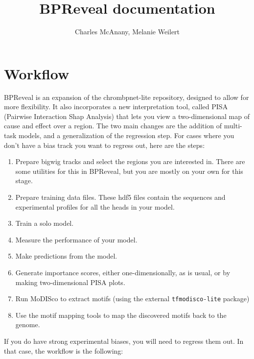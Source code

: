 \documentclass{article}
\title{BPReveal documentation}
\author{Charles McAnany, Melanie Weilert}
\begin{document}
\maketitle

\tableofcontents

\newpage

\section{Workflow}

BPReveal is an expansion of the chrombpnet-lite repository, designed to allow for more flexibility.
It also incorporates a new interpretation tool, called PISA (Pairwise Interaction Shap Analysis)
that lets you view a two-dimensional map of cause and effect over a region.
The two main changes are the addition of multi-task models, and a generalization of the regression
step.
For cases where you don't have a bias track you want to regress out, here are the steps:

\begin{enumerate}
    \item Prepare bigwig tracks and select the regions you are interested in. There are some
        utilities for this in BPReveal, but you are mostly on your own for this stage.
    \item Prepare training data files. These hdf5 files contain the sequences and experimental
        profiles for all the heads in your model.
    \item Train a solo model.
    \item Measure the performance of your model.
    \item Make predictions from the model.
    \item Generate importance scores, either one-dimensionally, as is usual, or by making
        two-dimensional PISA plots.
    \item Run MoDISco to extract motifs (using the external \texttt{tfmodisco-lite} package)
    \item Use the motif mapping tools to map the discovered motifs back to the genome.
\end{enumerate}

If you do have strong experimental biases, you will need to regress them out. In that case, the
workflow is the following:
\end{document}
